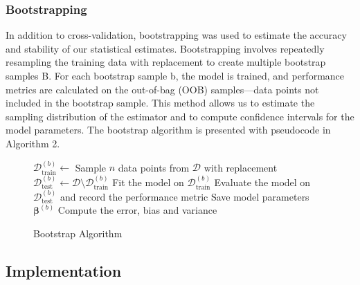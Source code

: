 \subsubsection{Bootstrapping}

In addition to cross-validation, bootstrapping was used to estimate the accuracy and stability of our statistical estimates. Bootstrapping involves repeatedly resampling the training data with replacement to create multiple bootstrap samples B. For each bootstrap sample b, the model is trained, and performance metrics are calculated on the out-of-bag (OOB) samples—data points not included in the bootstrap sample. This method allows us to estimate the sampling distribution of the estimator and to compute confidence intervals for the model parameters. The bootstrap algorithm is presented with pseudocode in Algorithm 2. 

\begin{figure}[H]
    \begin{algorithm}[H]
    \caption{Bootstrap Algorithm \cite{openai2023chatgpt}}
    \label{algo:bootstrap}
        \begin{algorithmic}[1]
                \State $\mathcal{D}^{(b)}_{\text{train}} \gets$ Sample $n$ data points from $\mathcal{D}$ with replacement
                \State $\mathcal{D}^{(b)}_{\text{test}} \gets \mathcal{D} \setminus \mathcal{D}^{(b)}_{\text{train}}$ 
                \State Fit the model on $\mathcal{D}^{(b)}_{\text{train}}$
                \State Evaluate the model on $\mathcal{D}^{(b)}_{\text{test}}$ and record the performance metric
                \State Save model parameters $\boldsymbol{\beta}^{(b)}$
            \EndFor
            \State Compute the error, bias and variance
            \EndProcedure
        \end{algorithmic}
    \end{algorithm}
\end{figure}

\subsection{Implementation}

